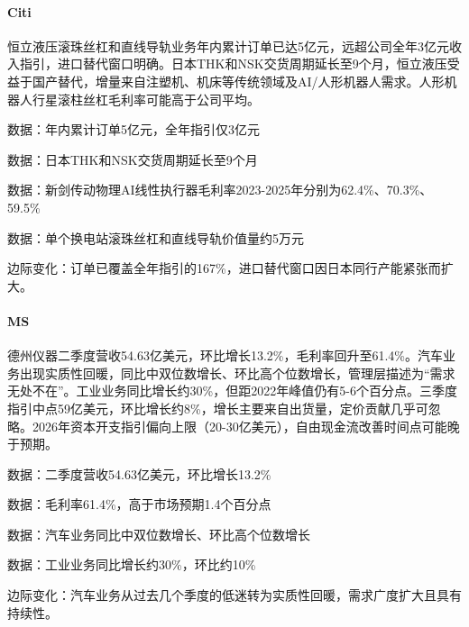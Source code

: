 \documentclass[11pt]{ctexart}
\begin{document}
\paragraph{Citi} 恒立液压滚珠丝杠和直线导轨业务年内累计订单已达5亿元，远超公司全年3亿元收入指引，进口替代窗口明确。日本THK和NSK交货周期延长至9个月，恒立液压受益于国产替代，增量来自注塑机、机床等传统领域及AI/人形机器人需求。人形机器人行星滚柱丝杠毛利率可能高于公司平均。
{\small\color{refgray}数据：年内累计订单5亿元，全年指引仅3亿元\par}
{\small\color{refgray}数据：日本THK和NSK交货周期延长至9个月\par}
{\small\color{refgray}数据：新剑传动物理AI线性执行器毛利率2023-2025年分别为62.4\%、70.3\%、59.5\%\par}
{\small\color{refgray}数据：单个换电站滚珠丝杠和直线导轨价值量约5万元\par}
{\small\color{refgray}边际变化：订单已覆盖全年指引的167\%，进口替代窗口因日本同行产能紧张而扩大。\par}
\paragraph{MS} 德州仪器二季度营收54.63亿美元，环比增长13.2\%，毛利率回升至61.4\%。汽车业务出现实质性回暖，同比中双位数增长、环比高个位数增长，管理层描述为“需求无处不在”。工业业务同比增长约30\%，但距2022年峰值仍有5-6个百分点。三季度指引中点59亿美元，环比增长约8\%，增长主要来自出货量，定价贡献几乎可忽略。2026年资本开支指引偏向上限（20-30亿美元），自由现金流改善时间点可能晚于预期。
{\small\color{refgray}数据：二季度营收54.63亿美元，环比增长13.2\%\par}
{\small\color{refgray}数据：毛利率61.4\%，高于市场预期1.4个百分点\par}
{\small\color{refgray}数据：汽车业务同比中双位数增长、环比高个位数增长\par}
{\small\color{refgray}数据：工业业务同比增长约30\%，环比约10\%\par}
{\small\color{refgray}边际变化：汽车业务从过去几个季度的低迷转为实质性回暖，需求广度扩大且具有持续性。\par}
\end{document}

